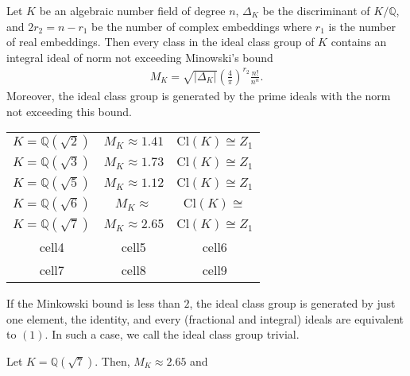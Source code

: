 \begin{thmbox}
    \begin{theorem}
        Let \(K\) be an algebraic number field of degree \(n\), \(\Delta_K\) be the discriminant of \(K / \mathbb{Q}\), and \(2 r_2 = n - r_1\) be the number of complex embeddings where \(r_1\) is the number of real embeddings. Then every class in the ideal class group of \(K\) contains an integral ideal of norm not exceeding Minowski's bound
        \begin{align*}
            M_K = \sqrt{|\Delta_K|} \left( \frac{4}{\pi} \right)^{r_2} \frac{n!}{n^n} \text{.}
        \end{align*}
        Moreover, the ideal class group is generated by the prime ideals with the norm not exceeding this bound.
    \end{theorem}
\end{thmbox}

\begin{center}
    \begin{tabular}{ c c c }
     \(K = \mathbb{Q}(\sqrt{2})\) & \(M_K \approx 1.41\) & \(\mathrm{Cl}(K) \cong Z_1 \) \\
     \(K = \mathbb{Q}(\sqrt{3})\) & \(M_K \approx 1.73\) & \(\mathrm{Cl}(K) \cong Z_1 \) \\
     \(K = \mathbb{Q}(\sqrt{5})\) & \(M_K \approx 1.12\) & \(\mathrm{Cl}(K) \cong Z_1 \) \\
     \(K = \mathbb{Q}(\sqrt{6})\) & \(M_K \approx\) & \(\mathrm{Cl}(K) \cong \) \\ 
     \(K = \mathbb{Q}(\sqrt{7})\) & \(M_K \approx 2.65\) & \(\mathrm{Cl}(K) \cong Z_1 \) \\ 
     cell4 & cell5 & cell6 \\  
     cell7 & cell8 & cell9    
    \end{tabular}
    \end{center}

\begin{example}
    If the Minkowski bound is less than \(2\), the ideal class group is generated by just one element, the identity, and every (fractional and integral) ideals are equivalent to \((1)\). In such a case, we call the ideal class group trivial.
\end{example}

\begin{example}
    Let \(K = \mathbb{Q}(\sqrt{7})\). Then, \(M_K \approx 2.65\) and 
\end{example}


